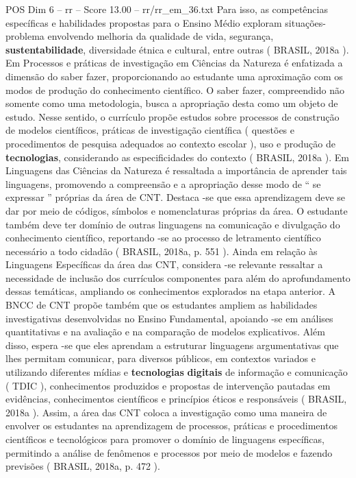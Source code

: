 \begin{textsample}{POS Dim 6 – rr – Score 13.00 – rr/rr\_em\_36.txt}
Para isso, as competências específicas e habilidades propostas para o Ensino Médio exploram situações-problema envolvendo melhoria da qualidade de vida, segurança, \textbf{sustentabilidade}, diversidade étnica e cultural, entre outras ( BRASIL, 2018a ).
Em Processos e práticas de investigação em Ciências da Natureza é enfatizada a dimensão do saber fazer, proporcionando ao estudante uma aproximação com os modos de produção do conhecimento científico.
O saber fazer, compreendido não somente como uma metodologia, busca a apropriação desta como um objeto de estudo.
Nesse sentido, o currículo propõe estudos sobre processos de construção de modelos científicos, práticas de investigação científica ( questões e procedimentos de pesquisa adequados ao contexto escolar ), uso e produção de \textbf{tecnologias}, considerando as especificidades do contexto ( BRASIL, 2018a ).
Em Linguagens das Ciências da Natureza é ressaltada a importância de aprender tais linguagens, promovendo a compreensão e a apropriação desse modo de “ se expressar ” próprias da área de CNT.
Destaca -se que essa aprendizagem deve se dar por meio de códigos, símbolos e nomenclaturas próprias da área.
O estudante também deve ter domínio de outras linguagens na comunicação e divulgação do conhecimento científico, reportando -se ao processo de letramento científico necessário a todo cidadão ( BRASIL, 2018a, p. 551 ).
Ainda em relação às Linguagens Específicas da área das CNT, considera -se relevante ressaltar a necessidade de inclusão dos currículos componentes para além do aprofundamento dessas temáticas, ampliando os conhecimentos explorados na etapa anterior.
A BNCC de CNT propõe também que os estudantes ampliem as habilidades investigativas desenvolvidas no Ensino Fundamental, apoiando -se em análises quantitativas e na avaliação e na comparação de modelos explicativos.
Além disso, espera -se que eles aprendam a estruturar linguagens argumentativas que lhes permitam comunicar, para diversos públicos, em contextos variados e utilizando diferentes mídias e \textbf{tecnologias} \textbf{digitais} de informação e comunicação ( TDIC ), conhecimentos produzidos e propostas de intervenção pautadas em evidências, conhecimentos científicos e princípios éticos e responsáveis ( BRASIL, 2018a ).
Assim, a área das CNT coloca a investigação como uma maneira de envolver os estudantes na aprendizagem de processos, práticas e procedimentos científicos e tecnológicos para promover o domínio de linguagens específicas, permitindo a análise de fenômenos e processos por meio de modelos e fazendo previsões ( BRASIL, 2018a, p. 472 ).

\end{textsample}
